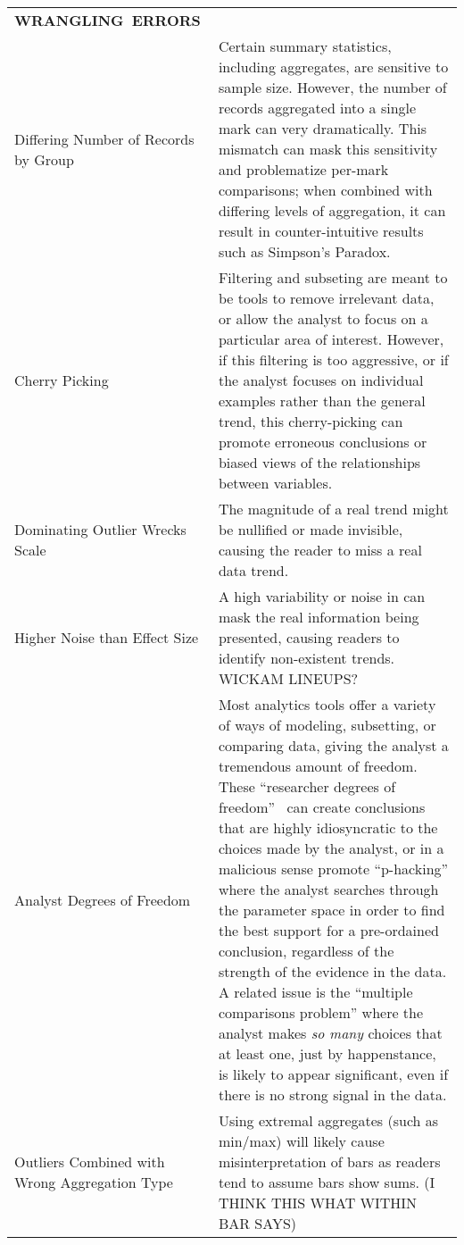 \begin{longtable}{p{3cm}p{14cm}}
  \hbox{\textbf{WRANGLING ERRORS}}& \\
   \rowcolor{colorb}Differing Number of Records by Group  & Certain summary statistics, including aggregates, are sensitive to sample size. However, the number of records aggregated into a single mark can very dramatically. This mismatch can mask this sensitivity and problematize per-mark comparisons; when combined with differing levels of aggregation, it can result in counter-intuitive results such as Simpson's Paradox. \cite{guo2017you}\\
 \rowcolor{colorb-opaque}Cherry Picking & Filtering and subseting are meant to be tools to remove irrelevant data, or allow the analyst to focus on a particular area of interest. However, if this filtering is too aggressive, or if the analyst focuses on individual examples rather than the general trend, this cherry-picking can promote erroneous conclusions or biased views of the relationships between variables. \cite{few2019loom}\\
 \rowcolor{colorb}Dominating Outlier Wrecks Scale & The magnitude of a real trend might be nullified or made invisible, causing the reader to miss a real data trend.  \cite{kindlmann2014algebraic}\\
 \rowcolor{colorb-opaque}Higher Noise than Effect Size & A high variability or noise in can mask the real information being presented, causing readers to identify non-existent trends. WICKAM LINEUPS?\\
 \rowcolor{colorb}Analyst Degrees of Freedom & Most analytics tools offer a variety of ways of modeling, subsetting, or comparing data, giving the analyst a tremendous amount of freedom. These ``researcher degrees of freedom''~\cite{} can create conclusions that are highly idiosyncratic to the choices made by the analyst, or in a malicious sense promote ``p-hacking'' where the analyst searches through the parameter space in order to find the best support for a pre-ordained conclusion, regardless of the strength of the evidence in the data. A related issue is the ``multiple comparisons problem'' where the analyst makes \emph{so many} choices that at least one, just by happenstance, is likely to appear significant, even if there is no strong signal in the data. \cite{gelman2013garden,pu2018garden,zgraggen2018investigating}\\
 \rowcolor{colorb-opaque}Outliers Combined with Wrong Aggregation Type & Using extremal aggregates (such as min/max) will likely cause misinterpretation of bars as readers tend to assume bars show sums. (I THINK THIS WHAT WITHIN BAR SAYS) \cite{newman2012bar}\\

\end{longtable}
